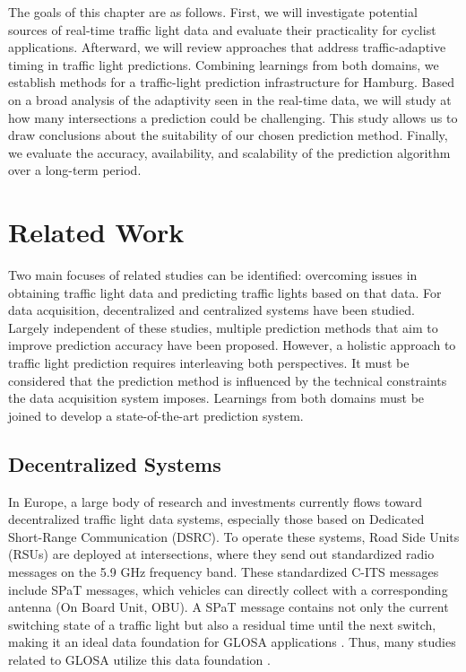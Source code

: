 The goals of this chapter are as follows. First, we will investigate potential sources of real-time traffic light data and evaluate their practicality for cyclist applications. Afterward, we will review approaches that address traffic-adaptive timing in traffic light predictions. Combining learnings from both domains, we establish methods for a traffic-light prediction infrastructure for Hamburg. Based on a broad analysis of the adaptivity seen in the real-time data, we will study at how many intersections a prediction could be challenging. This study allows us to draw conclusions about the suitability of our chosen prediction method. Finally, we evaluate the accuracy, availability, and scalability of the prediction algorithm over a long-term period.

\section{Related Work}

Two main focuses of related studies can be identified: overcoming issues in obtaining traffic light data and predicting traffic lights based on that data. For data acquisition, decentralized and centralized systems have been studied. Largely independent of these studies, multiple prediction methods that aim to improve prediction accuracy have been proposed. However, a holistic approach to traffic light prediction requires interleaving both perspectives. It must be considered that the prediction method is influenced by the technical constraints the data acquisition system imposes. Learnings from both domains must be joined to develop a state-of-the-art prediction system.

\subsection{Decentralized Systems}

In Europe, a large body of research and investments currently flows toward decentralized traffic light data systems, especially those based on Dedicated Short-Range Communication (DSRC). To operate these systems, Road Side Units (RSUs) are deployed at intersections, where they send out standardized radio messages on the 5.9 GHz frequency band. These standardized C-ITS messages include SPaT messages, which vehicles can directly collect with a corresponding antenna (On Board Unit, OBU). A SPaT message contains not only the current switching state of a traffic light but also a residual time until the next switch, making it an ideal data foundation for GLOSA applications \cite{ibrahim_estimating_2019}. Thus, many studies related to GLOSA utilize this data foundation \cite{schweiger_elisatm_2011, rakha_eco-driving_2011, rakha_aeris_2012, li_open_2012, suramardhana_driver-centric_2014, xu_bb_2015, bernais_design_2016, nguyen_efficient_2016, choudhury_integrated_2016, stahlmann_multi-hop_2017, stahlmann_exploring_2018, plianos_predictive_2018, zhang_green_2020, chen_developing_2022}.


